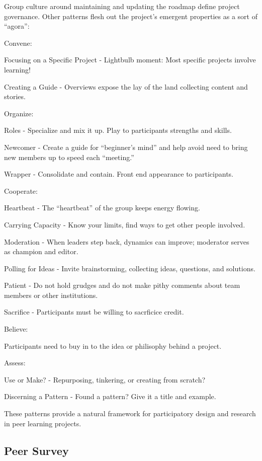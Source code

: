 \documentclass{acm_proc_article-sp}
\begin{document}
Group culture around maintaining and updating the roadmap define project governance. Other patterns flesh out the project's emergent properties as a sort of ``agora'':

Convene:

    Focusing on a Specific Project - Lightbulb moment: Most specific projects involve learning!

    Creating a Guide - Overviews expose the lay of the land collecting content and stories.

Organize:

    Roles - Specialize and mix it up. Play to participants strengths and skills.

    Newcomer - Create a guide for ``beginner's mind'' and help avoid need to bring new members up to speed each ``meeting.''

    Wrapper - Consolidate and contain. Front end appearance to participants.

Cooperate:

    Heartbeat - The ``heartbeat'' of the group keeps energy flowing.

    Carrying Capacity - Know your limits, find ways to get other people involved.

    Moderation - When leaders step back, dynamics can improve; moderator serves as champion and editor.

    Polling for Ideas - Invite brainstorming, collecting ideas, questions, and solutions.

    Patient - Do not hold grudges and do not make pithy comments about team members or other institutions.

    Sacrifice - Participants must be willing to sacrficice credit.

Believe:

    Participants need to buy in to the idea or philisophy behind a project.

Assess:

    Use or Make? - Repurposing, tinkering, or creating from scratch?

    Discerning a Pattern - Found a pattern? Give it a title and example.


These patterns provide a natural framework for participatory design and research in peer learning projects.

\subsection{Peer Survey}
\end{document}

